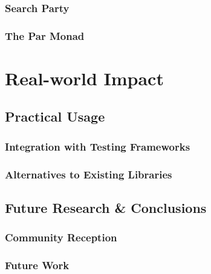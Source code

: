 \documentclass[openright, dottedtoc, headinclude, footinclude=true, a4paper, numbers=noenddot]{scrreprt}
\begin{document}
  \section{Search Party}
  \label{sec:casestudies-searchparty}
  

  \section{The Par Monad}
  \label{sec:casestudies-parmonad}
  

\part{Real-world Impact}
\label{part:impact}

\null\clearpage
\chapter{Practical Usage}
\label{chap:practice}


  \section{Integration with Testing Frameworks}
  \label{sec:practice-integration}
  

  \section{Alternatives to Existing Libraries}
  \label{sec:practice-alternatives}
  

\null\clearpage

\chapter{Future Research \& Conclusions}
\label{chap:conclusions}


  \section{Community Reception}
  \label{sec:conclusions-reception}
  

  \section{Future Work}
  \label{sec:conclusions-future}
  

\if@openright
  \cleardoublepage
\else
  \clearpage
\fi



\end{document}
